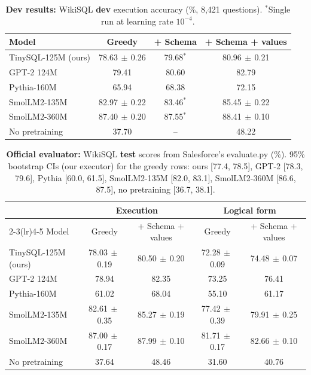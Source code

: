 \documentclass[11pt]{article}
\newcommand{\pmstd}[2]{#1{\scriptsize$\,\pm\,$#2}}
\begin{document}
\begin{table}[h]
\centering
\small
\begin{tabular}{lccc}
\toprule
Model & Greedy & + Schema & + Schema + values \\
\midrule
TinySQL-125M (ours) & \pmstd{78.63}{0.26} & 79.68$^*$ & \pmstd{80.96}{0.21} \\
GPT-2 124M & 79.41 & 80.60 & 82.79 \\
Pythia-160M & 65.94 & 68.38 & 72.15 \\
SmolLM2-135M & \pmstd{82.97}{0.22} & 83.46$^*$ & \pmstd{85.45}{0.22} \\
SmolLM2-360M & \pmstd{87.40}{0.20} & 87.55$^*$ & \pmstd{88.41}{0.10} \\
No pretraining & 37.70 & -- & 48.22 \\
\bottomrule
\end{tabular}
\caption{\textbf{Dev results:} WikiSQL \textbf{dev} execution accuracy (\%, 8,421 questions). $^*$Single run at learning rate $10^{-4}$.}
\label{tab:dev}
\end{table}

\begin{table}[h]
\centering
\small
\begin{tabular}{lcccc}
\toprule
& \multicolumn{2}{c}{Execution} & \multicolumn{2}{c}{Logical form} \\
\cmidrule(lr){2-3}\cmidrule(lr){4-5}
Model & Greedy & + Schema + values & Greedy & + Schema + values \\
\midrule
TinySQL-125M (ours) & \pmstd{78.03}{0.19} & \pmstd{80.50}{0.20} & \pmstd{72.28}{0.09} & \pmstd{74.48}{0.07} \\
GPT-2 124M & 78.94 & 82.35 & 73.25 & 76.41 \\
Pythia-160M & 61.02 & 68.04 & 55.10 & 61.17 \\
SmolLM2-135M & \pmstd{82.61}{0.35} & \pmstd{85.27}{0.19} & \pmstd{77.42}{0.39} & \pmstd{79.91}{0.25} \\
SmolLM2-360M & \pmstd{87.00}{0.17} & \pmstd{87.99}{0.10} & \pmstd{81.71}{0.17} & \pmstd{82.66}{0.10} \\
No pretraining & 37.64 & 48.46 & 31.60 & 40.76 \\
\bottomrule
\end{tabular}
\caption{\textbf{Official evaluator:} WikiSQL \textbf{test} scores from Salesforce's evaluate.py (\%). 95\% bootstrap CIs (our executor) for the greedy rows: ours [77.4, 78.5], GPT-2 [78.3, 79.6], Pythia [60.0, 61.5], SmolLM2-135M [82.0, 83.1], SmolLM2-360M [86.6, 87.5], no pretraining [36.7, 38.1].}
\label{tab:official}
\end{table}
\end{document}
